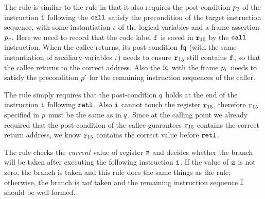 The  rule is similar to the
  rule in that it also requires the
 post-condition $p_2$ of the instruction
 $\texttt{i}$ following the $\texttt{call}$ satisfy the precondition of the target instruction
sequence, with some instantiation $\iota$ of the
logical variables and a frame assertion $p_r$.
Here we need to record that the code label $\texttt{f}_{}$
is saved in $\texttt{r}_{15}$ by the $\texttt{call}$ instruction.
When the callee returns, its post-condition $\text{fq}$
(with
the same instantiation of auxiliary variables $\iota$)
needs to ensure $\texttt{r}_{15}$ still contains $\texttt{f}_{}$,
so that the callee returns to the correct address.
Also the $\text{fq}$ with the frame $p_r$ needs
to satisfy the precondition $p'$ for the
remaining instruction sequences of the caller.

The  rule simply requires that
the post-condition $q$ holds
at the end of the instruction
$\texttt{i}$ following $\texttt{retl}$.
Also $\texttt{i}$ cannot touch the register $\texttt{r}_{15}$,
therefore $\texttt{r}_{15}$ specified in $p$ must be the same
as in $q$.
Since at the calling point we already required that
the post-condition of the callee guarantees $\texttt{r}_{15}$
contains the correct return address,
we know $\texttt{r}_{15}$ contains the correct value
before $\texttt{retl}$.

{\color{blue}
The  rule checks the {\em current} value of register $\texttt{z}$
and decides whether the branch will be taken
after executing the following instruction $\texttt{i}{}$. If the
value of $\texttt{z}$ is not zero,
the branch is taken and this rule does the same
things as the  rule; otherwise,
the branch is {\em not} taken and the remaining instruction
sequence $\mathbb{I}$ should be well-formed.
}

